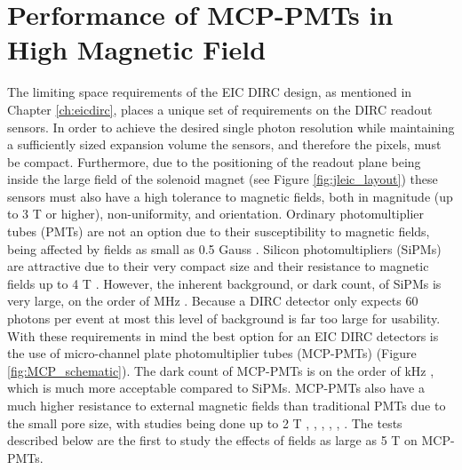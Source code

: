 

\section{Performance of MCP-PMTs in High Magnetic Field}
The limiting space requirements of the EIC DIRC design, as mentioned in Chapter \ref{ch:eicdirc}, places a unique set of requirements on the DIRC readout sensors. In order to achieve the desired single photon resolution while maintaining a sufficiently sized expansion volume the sensors, and therefore the pixels, must be compact. Furthermore, due to the positioning of the readout plane being inside the large field of the solenoid magnet (see Figure \ref{fig:jleic_layout}) these sensors must also have a high tolerance to magnetic fields, both in magnitude (up to 3 T or higher), non-uniformity, and orientation. Ordinary photomultiplier tubes (PMTs) are not an option due to their susceptibility to magnetic fields, being affected by fields as small as 0.5 Gauss \cite{PMT_magnet}. Silicon photomultipliers (SiPMs) are attractive due to their very compact size and their resistance to magnetic fields up to 4 T \cite{SiPM_characterization}. However, the inherent background, or dark count, of SiPMs is very large, on the order of MHz \cite{SiPM_characterization}. Because a DIRC detector only expects 60 photons per event at most this level of background is far too large for usability. With these requirements in mind the best option for an EIC DIRC detectors is the use of micro-channel plate photomultiplier tubes (MCP-PMTs) (Figure \ref{fig:MCP_schematic}). The dark count of MCP-PMTs is on the order of kHz \cite{MCPPMT_darkcount}, which is much more acceptable compared to SiPMs. MCP-PMTs also have a much higher resistance to external magnetic fields than traditional PMTs due to the small pore size, with studies being done up to 2 T \cite{MCPTest1}, \cite{MCPTest2}, \cite{MCPTest3}, \cite{MCPTest4}, \cite{MCPTest5}, \cite{MCPTest6}. The tests described below are the first to study the effects of fields as large as 5 T on MCP-PMTs.

